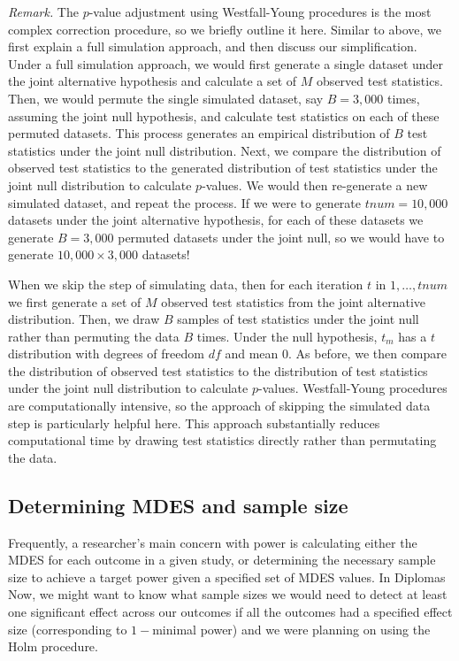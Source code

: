 \documentclass[
]{article}
\begin{document}
\emph{Remark.} The \(p\)-value adjustment using Westfall-Young
procedures is the most complex correction procedure, so we briefly
outline it here. Similar to above, we first explain a full simulation
approach, and then discuss our simplification. Under a full simulation
approach, we would first generate a single dataset under the joint
alternative hypothesis and calculate a set of \(M\) observed test
statistics. Then, we would permute the single simulated dataset, say
\(B = 3,000\) times, assuming the joint null hypothesis, and calculate
test statistics on each of these permuted datasets. This process
generates an empirical distribution of \(B\) test statistics under the
joint null distribution. Next, we compare the distribution of observed
test statistics to the generated distribution of test statistics under
the joint null distribution to calculate \(p\)-values. We would then
re-generate a new simulated dataset, and repeat the process. If we were
to generate \(tnum = 10,000\) datasets under the joint alternative
hypothesis, for each of these datasets we generate \(B = 3,000\)
permuted datasets under the joint null, so we would have to generate
\(10,000 \times 3,000\) datasets!

When we skip the step of simulating data, then for each iteration \(t\)
in \(1, \dots, tnum\) we first generate a set of \(M\) observed test
statistics from the joint alternative distribution. Then, we draw \(B\)
samples of test statistics under the joint null rather than permuting
the data \(B\) times. Under the null hypothesis, \(t_m\) has a \(t\)
distribution with degrees of freedom \(df\) and mean \(0\). As before,
we then compare the distribution of observed test statistics to the
distribution of test statistics under the joint null distribution to
calculate \(p\)-values. Westfall-Young procedures are computationally
intensive, so the approach of skipping the simulated data step is
particularly helpful here. This approach substantially reduces
computational time by drawing test statistics directly rather than
permutating the data.

\subsection{Determining MDES and sample size}
\label{sec:est_mdes_ss}

Frequently, a researcher's main concern with power is calculating either
the MDES for each outcome in a given study, or determining the necessary
sample size to achieve a target power given a specified set of MDES
values. In Diplomas Now, we might want to know what sample sizes we
would need to detect at least one significant effect across our outcomes
if all the outcomes had a specified effect size (corresponding to
\(1-\)minimal power) and we were planning on using the Holm procedure.
\end{document}
